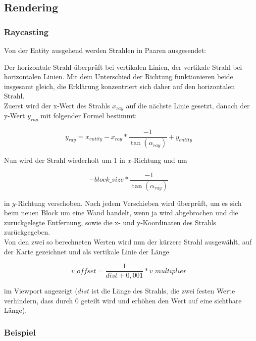 \documentclass[a4paper,titlepage]{article}
\begin{document}
    \subsection{Rendering}
    
    \subsubsection*{Raycasting}
    
    Von der Entity ausgehend werden Strahlen in Paaren ausgesendet:
    
    Der horizontale Strahl überprüft bei vertikalen Linien, der vertikale Strahl bei horizontalen Linien.
    Mit dem Unterschied der Richtung funktionieren beide insgesamt gleich, die Erklärung konzentriert sich daher auf den horizontalen Strahl.\\
    
    Zuerst wird der x-Wert des Strahls $x_{ray}$ auf die nächste Linie gesetzt, danach der y-Wert $y_{ray}$ mit folgender Formel bestimmt: 
    
    $$y_{ray} = x_{entity}-x_{ray}*\frac{-1}{\tan(\alpha_{ray})}+y_{entity}$$
    
    Nun wird der Strahl wiederholt um 1 in $x$-Richtung und um
    
    $$-block\_size * \frac{-1}{\tan(\alpha_{ray})}$$
    
    in $y$-Richtung verschoben. Nach jedem Verschieben wird überprüft, um es sich beim neuen Block um eine Wand handelt, wenn ja wird abgebrochen und die zurückgelegte Entfernung, sowie die x- und y-Koordinaten des Strahls zurückgegeben.\\
    
    Von den zwei so berechneten Werten wird nun der kürzere Strahl ausgewählt, auf der Karte gezeichnet und als vertikale Linie  der Länge
    
    $$v\_offset = \frac{1}{dist + 0,001} * v\_multiplier $$
    
    im Viewport angezeigt ($dist$ ist die Länge des Strahls, die zwei festen Werte verhindern, dass durch 0 geteilt wird und erhöhen den Wert auf eine sichtbare Länge).
    
    \subsubsection*{Beispiel}
    
\end{document}
